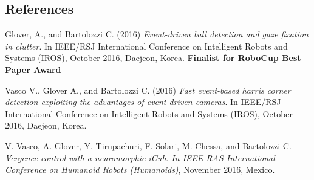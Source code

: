 \subsection*{References}

Glover, A., and Bartolozzi C. (2016) {\itshape Event-\/driven ball detection and gaze fixation in clutter}. In I\+E\+E\+E/\+R\+SJ International Conference on Intelligent Robots and Systems (I\+R\+OS), October 2016, Daejeon, Korea. {\bfseries Finalist for Robo\+Cup Best Paper Award}

Vasco V., Glover A., and Bartolozzi C. (2016) {\itshape Fast event-\/based harris corner detection exploiting the advantages of event-\/driven cameras}. In I\+E\+E\+E/\+R\+SJ International Conference on Intelligent Robots and Systems (I\+R\+OS), October 2016, Daejeon, Korea.

V. Vasco, A. Glover, Y. Tirupachuri, F. Solari, M. Chessa, and Bartolozzi C. {\itshape Vergence control with a neuromorphic i\+Cub. In I\+E\+E\+E-\/\+R\+AS International Conference on Humanoid Robots (Humanoids)}, November 2016, Mexico. 